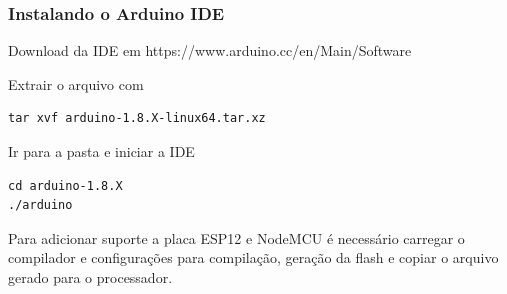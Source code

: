 \documentclass{beamer}
\begin{document}
\begin{frame}[fragile]
\frametitle{Instalando o Arduino IDE}


Download da IDE em https://www.arduino.cc/en/Main/Software

Extrair o arquivo com

\begin{lstlisting}
tar xvf arduino-1.8.X-linux64.tar.xz
\end{lstlisting}

Ir para a pasta e iniciar a IDE
\begin{lstlisting}
cd arduino-1.8.X 
./arduino
\end{lstlisting}


Para adicionar suporte a placa ESP12 e NodeMCU é necessário carregar o compilador e configurações para 
compilação, geração da flash e copiar o arquivo gerado para o processador. 

\end{frame}
\end{document}
